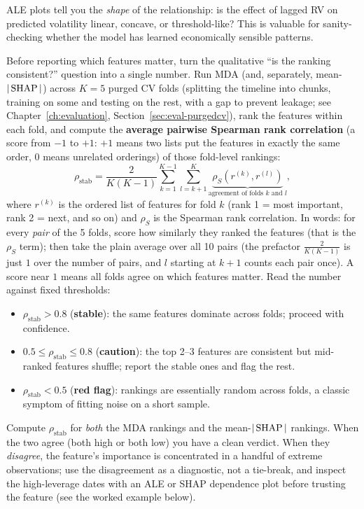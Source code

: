 ALE plots tell you the \emph{shape} of the relationship: is the effect of lagged RV on predicted volatility linear, concave, or threshold-like?
This is valuable for sanity-checking whether the model has learned economically sensible patterns.

\begin{keyidea}
Before reporting which features matter, turn the qualitative ``is the ranking consistent?'' question into a single number. Run MDA (and, separately, mean-$|\operatorname{SHAP}|$) across $K = 5$ purged CV folds (splitting the timeline into chunks, training on some and testing on the rest, with a gap to prevent leakage; see Chapter~\ref{ch:evaluation}, Section~\ref{sec:eval-purgedcv}), rank the features within each fold, and compute the \textbf{average pairwise Spearman rank correlation} (a score from $-1$ to $+1$: $+1$ means two lists put the features in exactly the same order, $0$ means unrelated orderings) of those fold-level rankings:
\begin{equation}\label{eq:importance-stability}
\rho_{\text{stab}} = \frac{2}{K(K-1)} \sum_{k=1}^{K-1} \sum_{l=k+1}^{K} \underbrace{\rho_S\!\left(r^{(k)}, r^{(l)}\right)}_{\text{agreement of folds } k \text{ and } l},
\end{equation}
where $r^{(k)}$ is the ordered list of features for fold $k$ (rank 1 = most important, rank 2 = next, and so on) and $\rho_S$ is the Spearman rank correlation. In words: for every \emph{pair} of the 5 folds, score how similarly they ranked the features (that is the $\rho_S$ term); then take the plain average over all 10 pairs (the prefactor $\tfrac{2}{K(K-1)}$ is just $1$ over the number of pairs, and $l$ starting at $k+1$ counts each pair once). A score near $1$ means all folds agree on which features matter. Read the number against fixed thresholds:
\begin{itemize}[nosep]
  \item $\rho_{\text{stab}} > 0.8$ (\textbf{stable}): the same features dominate across folds; proceed with confidence.
  \item $0.5 \le \rho_{\text{stab}} \le 0.8$ (\textbf{caution}): the top 2--3 features are consistent but mid-ranked features shuffle; report the stable ones and flag the rest.
  \item $\rho_{\text{stab}} < 0.5$ (\textbf{red flag}): rankings are essentially random across folds, a classic symptom of fitting noise on a short sample.
\end{itemize}
Compute $\rho_{\text{stab}}$ for \emph{both} the MDA rankings and the mean-$|\operatorname{SHAP}|$ rankings. When the two agree (both high or both low) you have a clean verdict. When they \emph{disagree}, the feature's importance is concentrated in a handful of extreme observations; use the disagreement as a diagnostic, not a tie-break, and inspect the high-leverage dates with an ALE or SHAP dependence plot before trusting the feature (see the worked example below).
\end{keyidea}

